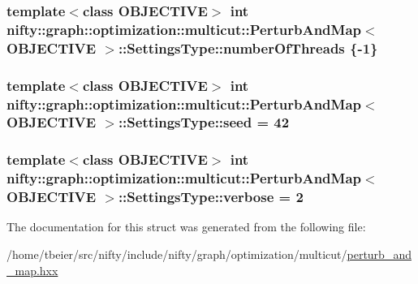 \subsubsection[{number\+Of\+Threads}]{\setlength{\rightskip}{0pt plus 5cm}template$<$class O\+B\+J\+E\+C\+T\+I\+V\+E$>$ int {\bf nifty\+::graph\+::optimization\+::multicut\+::\+Perturb\+And\+Map}$<$ O\+B\+J\+E\+C\+T\+I\+V\+E $>$\+::Settings\+Type\+::number\+Of\+Threads \{-\/1\}}\label{structnifty_1_1graph_1_1optimization_1_1multicut_1_1PerturbAndMap_1_1SettingsType_a9578f7286a2afc2a0ec8183980f7e883}
\hypertarget{structnifty_1_1graph_1_1optimization_1_1multicut_1_1PerturbAndMap_1_1SettingsType_a36d5a3f29c0562248c28b0b488109cf4}{}
\subsubsection[{seed}]{\setlength{\rightskip}{0pt plus 5cm}template$<$class O\+B\+J\+E\+C\+T\+I\+V\+E$>$ int {\bf nifty\+::graph\+::optimization\+::multicut\+::\+Perturb\+And\+Map}$<$ O\+B\+J\+E\+C\+T\+I\+V\+E $>$\+::Settings\+Type\+::seed = 42}\label{structnifty_1_1graph_1_1optimization_1_1multicut_1_1PerturbAndMap_1_1SettingsType_a36d5a3f29c0562248c28b0b488109cf4}
\hypertarget{structnifty_1_1graph_1_1optimization_1_1multicut_1_1PerturbAndMap_1_1SettingsType_a307c01ac19d277e4dc8ef0ac9ed8f53b}{}
\subsubsection[{verbose}]{\setlength{\rightskip}{0pt plus 5cm}template$<$class O\+B\+J\+E\+C\+T\+I\+V\+E$>$ int {\bf nifty\+::graph\+::optimization\+::multicut\+::\+Perturb\+And\+Map}$<$ O\+B\+J\+E\+C\+T\+I\+V\+E $>$\+::Settings\+Type\+::verbose = 2}\label{structnifty_1_1graph_1_1optimization_1_1multicut_1_1PerturbAndMap_1_1SettingsType_a307c01ac19d277e4dc8ef0ac9ed8f53b}


The documentation for this struct was generated from the following file\+:\begin{DoxyCompactItemize}
\item 
/home/tbeier/src/nifty/include/nifty/graph/optimization/multicut/\hyperlink{perturb__and__map_8hxx}{perturb\+\_\+and\+\_\+map.\+hxx}\end{DoxyCompactItemize}
